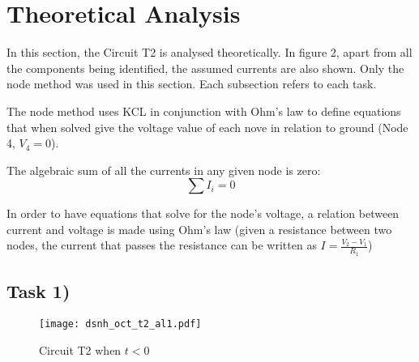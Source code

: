 
\section{Theoretical Analysis}
\label{sec:analysis}



In this section, the Circuit T2 is analysed theoretically. In figure 2,
apart from all the components being identified, the assumed currents are also shown.
Only the node method was used in this section. Each subsection refers to each task.



The node method uses KCL in conjunction with Ohm’s law to define equations that when solved give the voltage value 
of each nove in relation to ground (Node 4, $V_4 = 0$). 

The algebraic sum of all the currents in any given node is zero:
\begin{equation}
	\sum I_i = 0
	\label{eq:kcl}
\end{equation}

In order to have equations that solve for the node’s voltage, a relation between current and voltage is made using 
Ohm’s law (given a resistance between two nodes, the current that passes the resistance can be written as 
$I=\frac{V_2-V_1}{R_1}$)




\subsection{Task 1)}
\label{subsec:task1_a}

\begin{figure}[H]
	\centering
	\texttt{[image: dsnh\_oct\_t2\_al1.pdf]}
	\caption{Circuit T2 when $t<0$}
\label{fig:Dsnh_sim_t2}
\end{figure}


